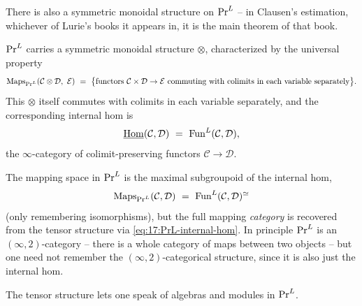 There is also a symmetric monoidal structure on $\mathrm{Pr}^{L}$ -- in Clausen's estimation, whichever
of Lurie's books it appears in, it is the main theorem of that book.

\begin{proposition}
\label{prop:17:PrL-tensor}
$\mathrm{Pr}^{L}$ carries a symmetric monoidal structure $\otimes$, characterized by the universal
property
\begin{equation*}
\Maps_{\PrL}(\mathcal C\otimes\mathcal D,\ \mathcal E)\ =\
\bigl\{\text{functors }\mathcal C\times\mathcal D\to\mathcal E\text{ commuting with colimits in each variable separately}\bigr\}.
\end{equation*}
This $\otimes$ itself commutes with colimits in each variable separately, and the
corresponding internal hom is
\begin{equation}
\label{eq:17:PrL-internal-hom}
\underline{\operatorname{Hom}}(\mathcal C,\mathcal D)\ =\ \mathrm{Fun}^{L}(\mathcal C,\mathcal D),
\end{equation}
the $\infty$-category of colimit-preserving functors $\mathcal C\to\mathcal D$.
\end{proposition}

\begin{remark}
\label{rmk:17:PrL-mapping}
The mapping space in $\mathrm{Pr}^{L}$ is the maximal subgroupoid of the internal hom,
\begin{equation*}
\Maps_{\PrL}(\mathcal C,\mathcal D)\ =\ \FunL(\mathcal C,\mathcal D)^{\simeq}
\end{equation*}
(only remembering isomorphisms), but the full mapping \emph{category} is recovered from the
tensor structure via \eqref{eq:17:PrL-internal-hom}. In principle $\mathrm{Pr}^{L}$ is an
$(\infty,2)$-category -- there is a whole category of maps between two objects -- but one
need not remember the $(\infty,2)$-categorical structure, since it is also just the internal
hom.
\end{remark}

The tensor structure lets one speak of algebras and modules in $\mathrm{Pr}^{L}$.

